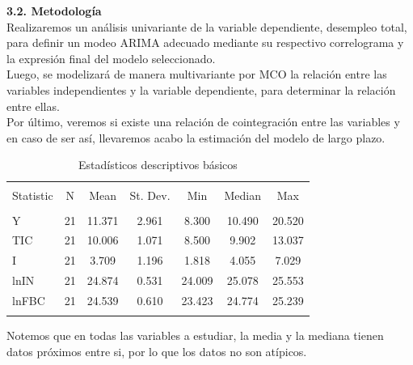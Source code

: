 \textbf{3.2. Metodología}\\

Realizaremos un análisis univariante de la variable dependiente, desempleo total, para definir un modeo ARIMA adecuado mediante su respectivo correlograma y la expresión final del modelo seleccionado.\\

Luego, se modelizará de manera multivariante por MCO la relación entre las variables independientes y la variable dependiente, para determinar la relación entre ellas.\\

Por último, veremos si existe una relación de cointegración entre las variables y en caso de ser así, llevaremos acabo la estimación del modelo de largo plazo.


\begin{table}[!htbp] \centering 
  \caption{Estadísticos descriptivos básicos} 
  \label{} 
\begin{tabular}{@{\extracolsep{5pt}}lcccccc} 
\\[-1.8ex]\hline 
\hline \\[-1.8ex] 
Statistic & \multicolumn{1}{c}{N} & \multicolumn{1}{c}{Mean} & \multicolumn{1}{c}{St. Dev.} & \multicolumn{1}{c}{Min} & \multicolumn{1}{c}{Median} & \multicolumn{1}{c}{Max} \\ 
\hline \\[-1.8ex] 
Y & 21 & 11.371 & 2.961 & 8.300 & 10.490 & 20.520 \\ 
TIC & 21 & 10.006 & 1.071 & 8.500 & 9.902 & 13.037 \\ 
I & 21 & 3.709 & 1.196 & 1.818 & 4.055 & 7.029 \\ 
lnIN & 21 & 24.874 & 0.531 & 24.009 & 25.078 & 25.553 \\ 
lnFBC & 21 & 24.539 & 0.610 & 23.423 & 24.774 & 25.239 \\ 
\hline \\[-1.8ex] 
\end{tabular} 
\end{table}

Notemos que en todas las variables a estudiar, la media y la mediana tienen datos próximos entre si, por lo que los datos no son atípicos.

